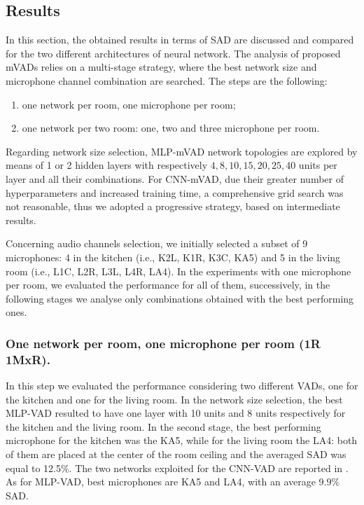\subsection{Results}
In this section, the obtained results in terms of SAD are discussed and compared for the two different architectures of neural network. The analysis of proposed mVADs relies on a multi-stage strategy, where the best network size and microphone channel combination are searched. The steps are the following:
\begin{enumerate}
	\item one network per room, one microphone per room;
	\item one network per two room: one, two and three microphone per room.
\end{enumerate}

Regarding network size selection, MLP-mVAD network topologies are explored by means of 1 or 2 hidden layers with respectively $4,8,10,15,20,25,40$ units per layer and all their combinations. 
For CNN-mVAD, due their greater number of hyperparameters and increased training time, a comprehensive grid search was not reasonable, thus we adopted a progressive strategy, based on intermediate results.

Concerning audio channels selection, we initially selected a subset of 9 microphones: 4 in the kitchen (i.e., K2L, K1R, K3C, KA5) and 5 in the living room (i.e., L1C, L2R, L3L, L4R, LA4).
In the experiments with one microphone per room, we evaluated the performance for all of them, successively, in the following stages we analyse only combinations obtained with the best performing ones.

\subsubsection{One network per room, one microphone per room (1R 1MxR). }
In this step we evaluated the performance considering two different VADs, one for the kitchen and one for the living room. In the network size selection, the best MLP-VAD resulted to have one layer with 10 units and 8 units respectively for the kitchen and the living room. In the second stage, the best performing microphone for the kitchen was the KA5, while for the living room the LA4: both of them are placed at the center of the room ceiling and the averaged SAD was equal to 12.5\%.
The two networks exploited for the CNN-VAD are reported in . As for MLP-VAD, best microphones are KA5 and LA4, with an average 9.9\% SAD.

